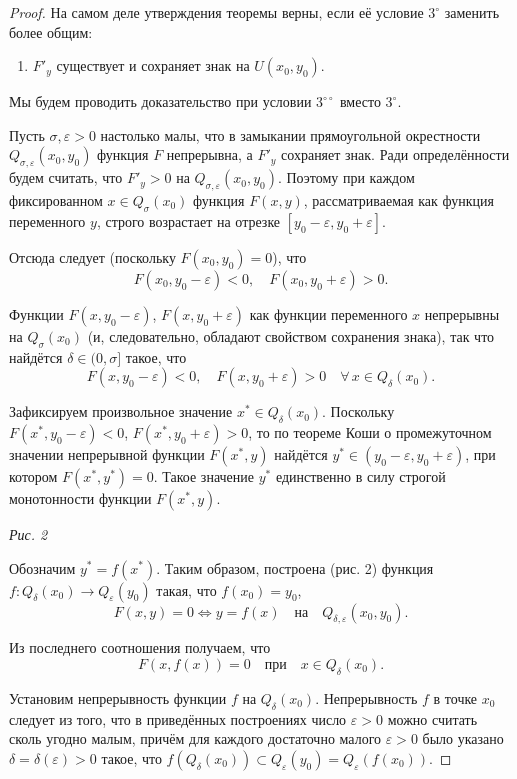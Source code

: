 \begin{proof}
На самом деле утверждения теоремы верны, если её условие $3^\circ$ заменить более общим:
\begin{enumerate}
    \item[$3^{\circ\circ}$] $F'_y$ существует и сохраняет знак на $U(x_0, y_0)$.
\end{enumerate}
Мы будем проводить доказательство при условии $3^{\circ\circ}$ вместо $3^\circ$.

Пусть $\sigma, \varepsilon > 0$ настолько малы, что в замыкании прямоугольной окрестности $Q_{\sigma, \varepsilon}(x_0, y_0)$ функция $F$ непрерывна, а $F'_y$ сохраняет знак. Ради определённости будем считать, что $F'_y > 0$ на $Q_{\sigma, \varepsilon}(x_0, y_0)$. Поэтому при каждом фиксированном $x \in Q_\sigma(x_0)$ функция $F(x, y)$, рассматриваемая как функция переменного $y$, строго возрастает на отрезке $[y_0 - \varepsilon, y_0 + \varepsilon]$.

Отсюда следует (поскольку $F(x_0, y_0) = 0$), что
$$
F(x_0, y_0 - \varepsilon) < 0, \quad F(x_0, y_0 + \varepsilon) > 0.
$$

Функции $F(x, y_0 - \varepsilon)$, $F(x, y_0 + \varepsilon)$ как функции переменного $x$ непрерывны на $Q_\sigma(x_0)$ (и, следовательно, обладают свойством сохранения знака), так что найдётся $\delta \in (0, \sigma]$ такое, что
$$
F(x, y_0 - \varepsilon) < 0, \quad F(x, y_0 + \varepsilon) > 0 \quad \forall\, x \in Q_\delta(x_0).
$$

Зафиксируем произвольное значение $x^* \in Q_\delta(x_0)$. Поскольку $F(x^*, y_0 - \varepsilon) < 0$, $F(x^*, y_0 + \varepsilon) > 0$, то по теореме Коши о промежуточном значении непрерывной функции $F(x^*, y)$ найдётся $y^* \in (y_0 - \varepsilon, y_0 + \varepsilon)$, при котором $F(x^*, y^*) = 0$. Такое значение $y^*$ единственно в силу строгой монотонности функции $F(x^*, y)$.

\begin{center}
\textit{Рис. 2}
\end{center}

Обозначим $y^* = f(x^*)$. Таким образом, построена (рис. 2) функция $f \colon Q_\delta(x_0) \to Q_\varepsilon(y_0)$ такая, что $f(x_0) = y_0$,
$$
F(x, y) = 0 \iff y = f(x) \quad \text{на} \quad Q_{\delta, \varepsilon}(x_0, y_0).
$$

Из последнего соотношения получаем, что
$$
F(x, f(x)) = 0 \quad \text{при} \quad x \in Q_\delta(x_0).
$$

Установим непрерывность функции $f$ на $Q_\delta(x_0)$. Непрерывность $f$ в точке $x_0$ следует из того, что в приведённых построениях число $\varepsilon > 0$ можно считать сколь угодно малым, причём для каждого достаточно малого $\varepsilon > 0$ было указано $\delta = \delta(\varepsilon) > 0$ такое, что $f(Q_\delta(x_0)) \subset Q_\varepsilon(y_0) = Q_\varepsilon(f(x_0))$.


\end{proof}
